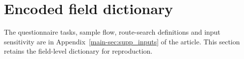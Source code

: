 \section{Encoded field dictionary}
\label{sec:field_dictionary}
The questionnaire tasks, sample flow, route-search definitions and input sensitivity are in Appendix~\ref{main-sec:supp_inputs} of the article. This section retains the field-level dictionary for reproduction.

\FloatBarrier
